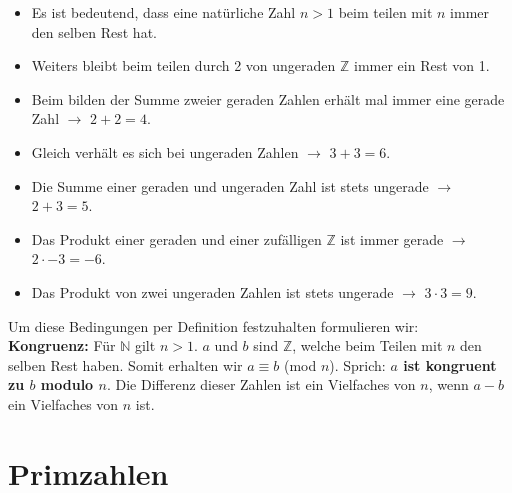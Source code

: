 \documentclass[german,12pt,a4paper]{article}
\begin{document}
\begin{itemize}
    \item Es ist bedeutend, dass eine natürliche Zahl $n>1$ beim teilen mit $n$ immer den selben Rest hat.
    \item Weiters bleibt beim teilen durch 2 von ungeraden $\mathbb{Z}$ immer ein Rest von 1.
    \item Beim bilden der Summe zweier geraden Zahlen erhält mal immer eine gerade Zahl $\rightarrow$ $2+2=4$.
    \item Gleich verhält es sich bei ungeraden Zahlen $\rightarrow$ $3+3=6$.
    \item Die Summe einer geraden und ungeraden Zahl ist stets ungerade $\rightarrow$ $2+3=5$.
    \item Das Produkt einer geraden und einer zufälligen $\mathbb{Z}$ ist immer gerade $\rightarrow$ $2 \cdot -3 = -6$.
    \item Das Produkt von zwei ungeraden Zahlen ist stets ungerade $\rightarrow$ $3 \cdot 3 = 9$.
\end{itemize}

Um diese Bedingungen per Definition festzuhalten formulieren wir:\\
\textbf{Kongruenz:} Für $\mathbb{N}$ gilt $n>1$. $a$ und $b$ sind $\mathbb{Z}$, welche beim Teilen mit $n$ den selben Rest haben. Somit erhalten wir $a\equiv b$ (mod $n$). Sprich: \textbf{$a$ ist kongruent zu $b$ modulo $n$}. Die Differenz dieser Zahlen ist ein Vielfaches von $n$, wenn $a-b$ ein Vielfaches von $n$ ist.


\section{Primzahlen}
\end{document}
